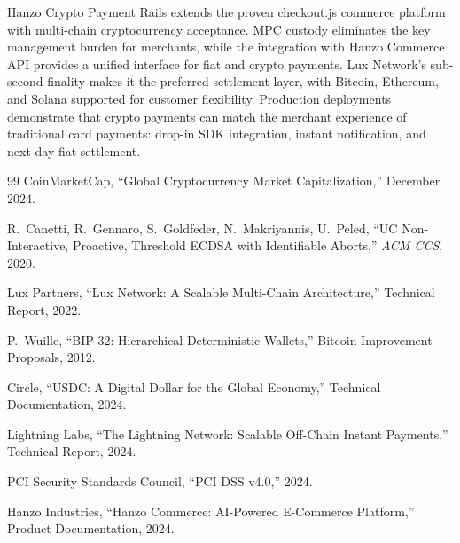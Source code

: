\documentclass[11pt]{article}
\begin{document}
Hanzo Crypto Payment Rails extends the proven checkout.js commerce
platform with multi-chain cryptocurrency acceptance. MPC custody
eliminates the key management burden for merchants, while the
integration with Hanzo Commerce API provides a unified interface for
fiat and crypto payments. Lux Network's sub-second finality makes it
the preferred settlement layer, with Bitcoin, Ethereum, and Solana
supported for customer flexibility. Production deployments demonstrate
that crypto payments can match the merchant experience of traditional
card payments: drop-in SDK integration, instant notification, and
next-day fiat settlement.

\begin{thebibliography}{99}
CoinMarketCap, ``Global Cryptocurrency Market Capitalization,''
December 2024.

R.~Canetti, R.~Gennaro, S.~Goldfeder, N.~Makriyannis, U.~Peled,
``UC Non-Interactive, Proactive, Threshold ECDSA with Identifiable
Aborts,'' \textit{ACM CCS}, 2020.

Lux Partners, ``Lux Network: A Scalable Multi-Chain Architecture,''
Technical Report, 2022.

P.~Wuille, ``BIP-32: Hierarchical Deterministic Wallets,''
Bitcoin Improvement Proposals, 2012.

Circle, ``USDC: A Digital Dollar for the Global Economy,''
Technical Documentation, 2024.

Lightning Labs, ``The Lightning Network: Scalable Off-Chain Instant
Payments,'' Technical Report, 2024.

PCI Security Standards Council, ``PCI DSS v4.0,'' 2024.

Hanzo Industries, ``Hanzo Commerce: AI-Powered E-Commerce Platform,''
Product Documentation, 2024.
\end{thebibliography}
\end{document}

